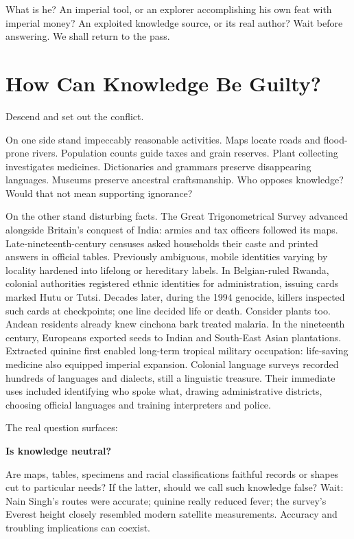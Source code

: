 What is he? An imperial tool, or an explorer accomplishing his own feat with imperial money? An exploited knowledge source, or its real author? Wait before answering. We shall return to the pass.

\section{How Can Knowledge Be Guilty?}
Descend and set out the conflict.

On one side stand impeccably reasonable activities. Maps locate roads and flood-prone rivers. Population counts guide taxes and grain reserves. Plant collecting investigates medicines. Dictionaries and grammars preserve disappearing languages. Museums preserve ancestral craftsmanship. Who opposes knowledge? Would that not mean supporting ignorance?

On the other stand disturbing facts. The Great Trigonometrical Survey advanced alongside Britain's conquest of India: armies and tax officers followed its maps. Late-nineteenth-century censuses asked households their caste and printed answers in official tables. Previously ambiguous, mobile identities varying by locality hardened into lifelong or hereditary labels. In Belgian-ruled Rwanda, colonial authorities registered ethnic identities for administration, issuing cards marked Hutu or Tutsi. Decades later, during the 1994 genocide, killers inspected such cards at checkpoints; one line decided life or death. Consider plants too. Andean residents already knew cinchona bark treated malaria. In the nineteenth century, Europeans exported seeds to Indian and South-East Asian plantations. Extracted quinine first enabled long-term tropical military occupation: life-saving medicine also equipped imperial expansion. Colonial language surveys recorded hundreds of languages and dialects, still a linguistic treasure. Their immediate uses included identifying who spoke what, drawing administrative districts, choosing official languages and training interpreters and police.

The real question surfaces:

\textbf{Is knowledge neutral?}

Are maps, tables, specimens and racial classifications faithful records or shapes cut to particular needs? If the latter, should we call such knowledge false? Wait: Nain Singh's routes were accurate; quinine really reduced fever; the survey's Everest height closely resembled modern satellite measurements. Accuracy and troubling implications can coexist.

